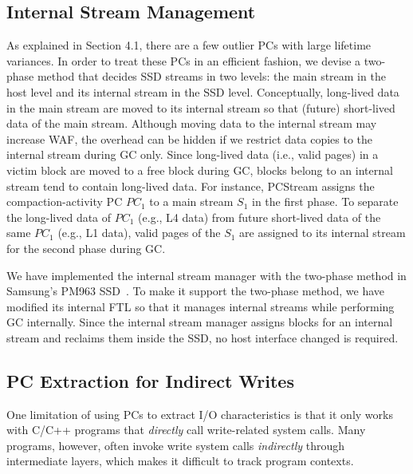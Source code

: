 \subsection{Internal Stream Management}
\vspace{-5pt}
{\color{blue}
As explained in Section 4.1, there are a few outlier PCs with large lifetime
variances. In order to treat these PCs in an efficient fashion,
}
we devise a
two-phase method that decides SSD streams in two levels: the main stream in the
host level and its internal stream in the SSD level.  Conceptually, long-lived
data in the main stream are moved to its internal stream so that
(future) short-lived data of the main stream.  Although moving data to the
internal stream may increase WAF, the overhead can be hidden if we restrict
data copies to the internal stream during GC only.  Since long-lived data
(i.e., valid pages) in a victim block are moved to a free block during GC,
blocks belong to an internal stream tend to contain long-lived data.  For
instance, \textsf{\small PCStream} assigns the compaction-activity PC {\it
$PC_1$} to a main stream {\it $S_1$} in the first phase.  To separate the
long-lived data of {\it $PC_1$} (e.g., L4 data) from future short-lived data of
the same {\it $PC_1$} (e.g., L1 data), valid pages of the {\it $S_1$} are
assigned to its internal stream for the second phase during GC.

We have implemented the internal stream manager with the two-phase method in
Samsung's PM963 SSD~\cite{PM963}. To make it support the two-phase method, we
have modified its internal FTL so that it manages internal streams while
performing GC internally. 
{\color{blue}
Since the internal stream manager assigns blocks for an internal stream 
and reclaims them inside the SSD, no host interface changed is required.
}


\vspace{-10pt}
\subsection{PC Extraction for Indirect Writes}
\vspace{-5pt}
One limitation of using PCs to extract I/O characteristics is that it only
works with C/C++ programs that \textit{directly} call write-related system
calls.  Many programs, however, often invoke write system calls
\textit{indirectly} through intermediate layers, which makes it difficult to
track program contexts.

